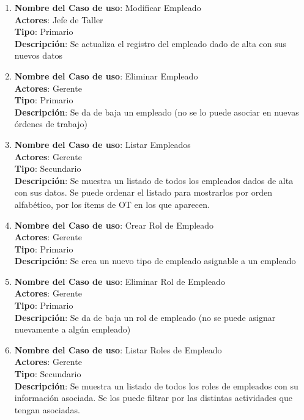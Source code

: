 \documentclass[12pt]{extarticle}
\begin{document}
\begin{spacing}{1.2}
\begin{enumerate}
        \item 	\textbf{Nombre del Caso de uso}: Modificar Empleado\\
                \textbf{Actores}: Jefe de Taller\\
                \textbf{Tipo}: Primario\\
                \textbf{Descripción}: Se actualiza el registro del empleado dado de alta con sus nuevos datos
        
        \item 	\textbf{Nombre del Caso de uso}: Eliminar Empleado\\
                \textbf{Actores}: Gerente\\
                \textbf{Tipo}: Primario\\
                \textbf{Descripción}: Se da de baja un empleado (no se lo puede asociar en nuevas órdenes de trabajo)
        
        \item 	\textbf{Nombre del Caso de uso}: Listar Empleados\\
                \textbf{Actores}: Gerente\\
                \textbf{Tipo}: Secundario\\
                \textbf{Descripción}: Se muestra un listado de todos los empleados dados de alta con sus datos. Se puede ordenar el listado para mostrarlos por orden alfabético, por los ítems de OT en los que aparecen.
        
        \item 	\textbf{Nombre del Caso de uso}: Crear Rol de Empleado\\
                \textbf{Actores}: Gerente\\
                \textbf{Tipo}: Primario\\
                \textbf{Descripción}: Se crea un nuevo tipo de empleado asignable a un empleado
        
        \item 	\textbf{Nombre del Caso de uso}: Eliminar Rol de Empleado\\
                \textbf{Actores}: Gerente\\
                \textbf{Tipo}: Primario\\
                \textbf{Descripción}: Se da de baja un rol de empleado (no se puede asignar nuevamente a algún empleado)
        
        \item 	\textbf{Nombre del Caso de uso}: Listar Roles de Empleado\\
                \textbf{Actores}: Gerente\\
                \textbf{Tipo}: Secundario\\
                \textbf{Descripción}: Se muestra un listado de todos los roles de empleados con su información asociada. Se los puede filtrar por las distintas actividades que tengan asociadas.
        



\end{enumerate}
\end{spacing}
\end{document}

